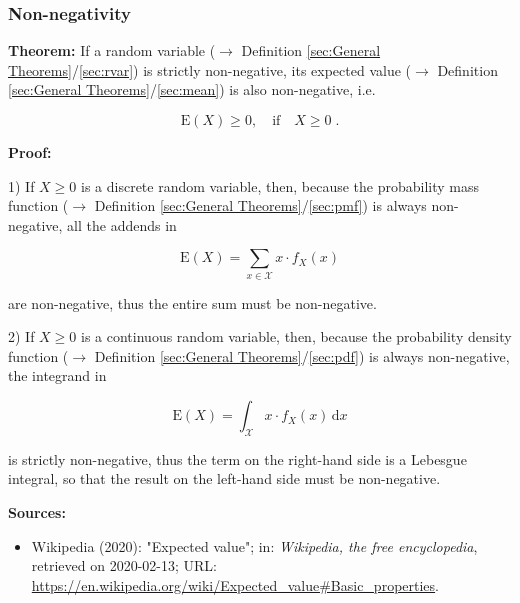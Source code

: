 \documentclass[a4paper,12pt,twoside]{book}
\begin{document}
\subsubsection[\textbf{Non-negativity}]{Non-negativity} \label{sec:mean-nonneg}
\setcounter{equation}{0}

\textbf{Theorem:} If a random variable ($\rightarrow$ Definition \ref{sec:General Theorems}/\ref{sec:rvar}) is strictly non-negative, its expected value ($\rightarrow$ Definition \ref{sec:General Theorems}/\ref{sec:mean}) is also non-negative, i.e.

\begin{equation} \label{eq:mean-nonneg-mean-nonneg}
\mathrm{E}(X) \geq 0, \quad \text{if} \quad X \geq 0 \; .
\end{equation}


\vspace{1em}
\textbf{Proof:}

1) If $X \geq 0$ is a discrete random variable, then, because the probability mass function ($\rightarrow$ Definition \ref{sec:General Theorems}/\ref{sec:pmf}) is always non-negative, all the addends in

\begin{equation} \label{eq:mean-nonneg-mean-disc}
\mathrm{E}(X) = \sum_{x \in \mathcal{X}} x \cdot f_X(x)
\end{equation}

are non-negative, thus the entire sum must be non-negative.

\vspace{1em}
2) If $X \geq 0$ is a continuous random variable, then, because the probability density function ($\rightarrow$ Definition \ref{sec:General Theorems}/\ref{sec:pdf}) is always non-negative, the integrand in

\begin{equation} \label{eq:mean-nonneg-mean-cont}
\mathrm{E}(X) = \int_{\mathcal{X}} x \cdot f_X(x) \, \mathrm{d}x
\end{equation}

is strictly non-negative, thus the term on the right-hand side is a Lebesgue integral, so that the result on the left-hand side must be non-negative.


\vspace{1em}
\textbf{Sources:}
\begin{itemize}
\item Wikipedia (2020): "Expected value"; in: \textit{Wikipedia, the free encyclopedia}, retrieved on 2020-02-13; URL: \url{https://en.wikipedia.org/wiki/Expected_value#Basic_properties}.
\end{itemize}
\end{document}
